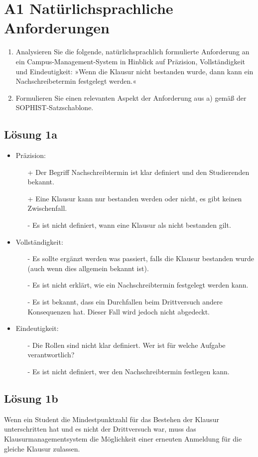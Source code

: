 \documentclass[main.tex]{subfiles}
\begin{document}
\section{A1 Natürlichsprachliche Anforderungen}

\begin{enumerate}
\item Analysieren Sie die folgende, natürlichsprachlich formulierte Anforderung an ein Campus-Management-System in Hinblick auf Präzision, Vollständigkeit und Eindeutigkeit:
»Wenn die Klausur nicht bestanden wurde, dann kann ein Nachschreibetermin festgelegt werden.«
\item Formulieren Sie einen relevanten Aspekt der Anforderung aus a) gemäß der SOPHIST-Satzschablone.
\end{enumerate}

\subsection{Lösung 1a}

\begin{itemize}
\item Präzision:
\begin{itemize}
    \item[+] Der Begriff Nachschreibtermin ist klar definiert und den Studierenden bekannt.
    \item[+] Eine Klausur kann nur bestanden werden oder nicht, es gibt keinen Zwischenfall.
    \item[-] Es ist nicht definiert, wann eine Klausur als nicht bestanden gilt.
\end{itemize}

\item Vollständigkeit:
\begin{itemize}
    \item[-] Es sollte ergänzt werden was passiert, falls die Klausur bestanden wurde (auch wenn dies allgemein bekannt ist).
    \item[-] Es ist nicht erklärt, wie ein Nachschreibtermin festgelegt werden kann.
    \item[-] Es ist bekannt, dass ein Durchfallen beim Drittversuch andere Konsequenzen hat. Dieser Fall wird jedoch nicht abgedeckt.
\end{itemize}

\item Eindeutigkeit:
\begin{itemize}
    \item[-] Die Rollen sind nicht klar definiert. Wer ist für welche Aufgabe verantwortlich?
    \item[-] Es ist nicht definiert, wer den Nachschreibtermin festlegen kann.
\end{itemize}

\end{itemize}


\subsection{Lösung 1b}
Wenn ein Student die Mindestpunktzahl für das Bestehen der Klausur unterschritten hat und es nicht der Drittversuch war, muss das Klausurmanagementsystem die Möglichkeit einer erneuten Anmeldung für die gleiche Klausur zulassen.
\end{document}
